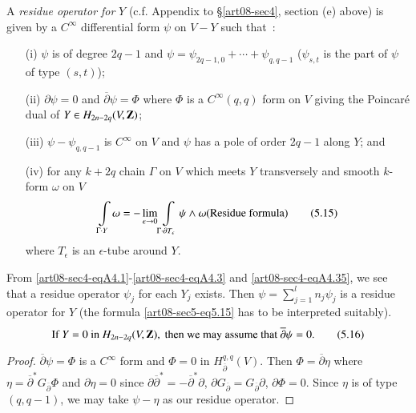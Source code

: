 A {\em residue operator for} $Y$ (c.f. Appendix to \S\ref{art08-sec4}, section (e) above) is given by a $C^{\infty}$ differential form $\psi$ on $V-Y$ such that~:
\begin{itemize}
\item[(i)] $\psi$ is of degree $2q-1$ and $\psi=\psi_{2q-1,0}+\cdots+\psi_{q,q-1}$ ($\psi_{s,t}$ is the part of $\psi$ of type $(s,t)$);

\item[(ii)] $\partial \psi=0$ and $\overline{\partial}\psi=\Phi$ where $\Phi$ is a $C^{\infty}(q,q)$ form on $V$ giving the Poincar\'e dual of $Y\in H_{2n-2q}(V,\mathbf{Z})$;

\item[(iii)] $\psi-\psi_{q,q-1}$ is $C^{\infty}$ on $V$ and $\psi$ has a pole of order $2q-1$ along $Y$; and

\item[(iv)] for any $k+2q$ chain $\Gamma$ on $V$ which meets $Y$ transversely and smooth $k$-form $\omega$ on $V$
\begin{equation*}
\int\limits_{\Gamma\cdot Y}\omega=-\lim\limits_{\epsilon\to 0}\int\limits_{\Gamma\cdot \partial T_{\epsilon}}\psi \wedge\omega (\textit{\em Residue formula})\tag{5.15}\label{art08-sec5-eq5.15}
\end{equation*}
where $T_{\epsilon}$ is an $\epsilon$-tube around $Y$.
\end{itemize}

From \eqref{art08-sec4-eqA4.1}-\eqref{art08-sec4-eqA4.3} and \eqref{art08-sec4-eqA4.35}, we see that a residue operator $\psi_{j}$ for each $Y_{j}$ exists. Then $\psi=\sum\limits^{l}_{j=1}n_{j}\psi_{j}$ is a residue operator for $Y$ (the formula \eqref{art08-sec5-eq5.15} has to be interpreted suitably).
\begin{equation*}
\text{If }Y=0\text{ in }H_{2n-2q}(V,\mathbf{Z}),\text{ then we may assume that } \overline{\partial}\psi=0.\tag{5.16}\label{art08-sec5-eq5.16}
\end{equation*}

\begin{proof}
$\overline{\partial}\psi=\Phi$ is a $C^{\infty}$ form and $\Phi=0$ in $H^{q,q}_{\overline{\partial}}(V)$. Then $\Phi=\overline{\partial}\eta$ where $\eta=\overline{\partial}^{*}G_{\overline{\partial}}\Phi$ and $\partial \eta=0$ since $\partial \overline{\partial}^{*}=-\overline{\partial}^{*}\partial$, $\partial G_{\overline{\partial}}=G_{\overline{\partial}}\partial$, $\partial \Phi=0$. Since $\eta$ is of type $(q,q-1)$, we may take $\psi-\eta$ as our residue operator.
\end{proof}

